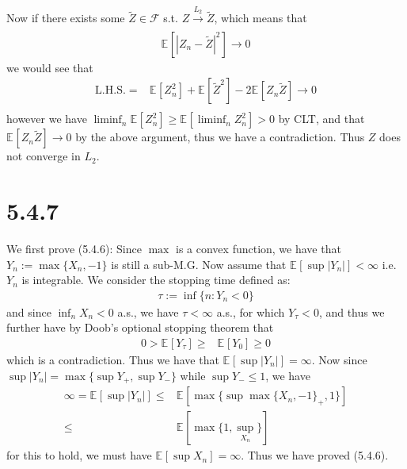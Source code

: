 \documentclass[11pt,a4paper]{ctexart}
\numberwithin{equation}{section}%
\newcommand{\F}{\mathcal{F}}
\begin{document}
Now if there exists some $ \tilde{Z} \in \F  $ s.t. $ Z\xrightarrow[]{L_2} \tilde{Z} $, which means that
\begin{align*}
    \mathbb{E}_{  }\left[ \left\vert Z_n-\tilde{Z} \right\vert ^2 \right] \to 0 
\end{align*}
we would see that
\begin{align*}
     \mathrm{L.H.S.} =& \mathbb{E}_{  }\left[ Z_n^2 \right] + \mathbb{E}_{  }\left[ \tilde{Z}^2 \right] - 2\mathbb{E}_{  }\left[ Z_n\tilde{Z} \right] \to 0\\
\end{align*}
however we have $ \liminf_n \mathbb{E}_{  }\left[ Z_n^2 \right]  \geq \mathbb{E}_{  }\left[ \liminf_n Z_n^2 \right] >0 $ by CLT, and that $ \mathbb{E}_{  }\left[ Z_n\tilde{Z} \right] \to 0 $ by the above argument, thus we have a contradiction. Thus $ Z $ does not converge in $ L_2 $. 



\section{5.4.7}

We first prove (5.4.6): Since $ \max $ is a convex function, we have that $ Y_n:=\max\{X_n,-1\} $ is still a sub-M.G. Now assume that $ \mathbb{E}_{  }\left[ \sup \left\vert Y_n \right\vert  \right]  <\infty $ i.e. $ Y_n $ is integrable. We consider the stopping time defined as:
\begin{align*}
    \tau:= \inf\{n: Y_n<0\} 
\end{align*}
and since $ \inf_n X_n <0 $ a.s., we have $ \tau <\infty $ a.s., for which $ Y_\tau <0 $, and thus we further have by Doob's optional stopping theorem that
\begin{align*}
    0>\mathbb{E}_{  }\left[ Y_\tau \right] \geq & \mathbb{E}_{  }\left[ Y_0 \right] \geq 0
\end{align*}
which is a contradiction. Thus we have that $ \mathbb{E}_{  }\left[ \sup \left\vert Y_n \right\vert  \right]  =\infty $. Now since $ \sup \left\vert Y_n \right\vert  = \max \{ \sup Y_+, \sup Y_- \} $ while $ \sup Y_- \leq 1 $, we have
\begin{align*}
     \infty = \mathbb{E}_{  }\left[ \sup\left\vert Y_n \right\vert  \right]  \leq & \mathbb{E}_{  }\left[ \max \{ \sup \max\{X_n,-1\}_+, 1 \}\right] \\
     \leq& \mathbb{E}_{  }\left[ \max\{ 1, \sup_{X_n}\} \right] 
\end{align*}
for this to hold, we must have $ \mathbb{E}_{  }\left[ \sup X_n \right] =\infty $. Thus we have proved (5.4.6).
\end{document}
